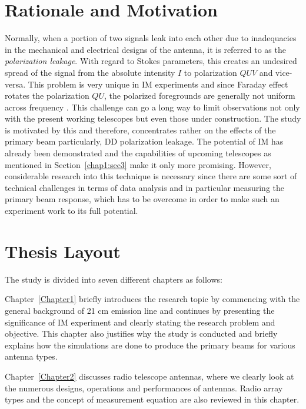 \section{Rationale and Motivation} 	\label{chap1:sec7}
Normally, when a portion of two signals leak into each other due to inadequacies in the mechanical and electrical designs of the antenna, it is referred to as the
\emph{polarization leakage}. With regard to Stokes parameters, this creates an undesired spread of the signal from the absolute intensity $I$ to polarization $QUV$  and vice-versa.
This problem is  very unique in IM experiments and since Faraday effect rotates the polarization $QU$, the polarized foregrounds are generally not uniform across 
frequency \citep{doi:10.1093/mnras/stv1107}. This challenge can go a long way to limit observations not only with the present working telescopes but even those under construction.   
The study is motivated by this and therefore, concentrates rather on the effects of the primary beam particularly, DD polarization leakage. The potential of IM has already been demonstrated \citep{2015aska.confE..35W,2008PhRvL.100i1303C,2014MNRAS.441.3271W,2008PhRvL.100p1301L,2015aska.confE..19S} and the capabilities of upcoming telescopes as mentioned in Section~\ref{chap1:sec3} make it only more promising. However, considerable research into this
technique is necessary since there are some sort of technical challenges in terms of data analysis and in particular measuring the primary beam response, which has to be overcome in order to make such an experiment work to its full potential.
%

\section{Thesis Layout}	 \label{chap1:sec8}
%
The study is divided into seven different chapters as follows:

Chapter~\ref{Chapter1} briefly introduces the research topic by commencing with the general background of 21 cm emission line and continues by
presenting the significance of IM experiment and clearly stating the research problem and objective. This chapter also justifies why the study is conducted 
and briefly explains how the simulations are done to produce the primary beams for various antenna types.

Chapter~\ref{Chapter2} discusses radio telescope antennas, where we clearly look at the numerous designs, operations and performances of antennas. 
Radio array types and the concept of measurement equation are also reviewed in this chapter.  


